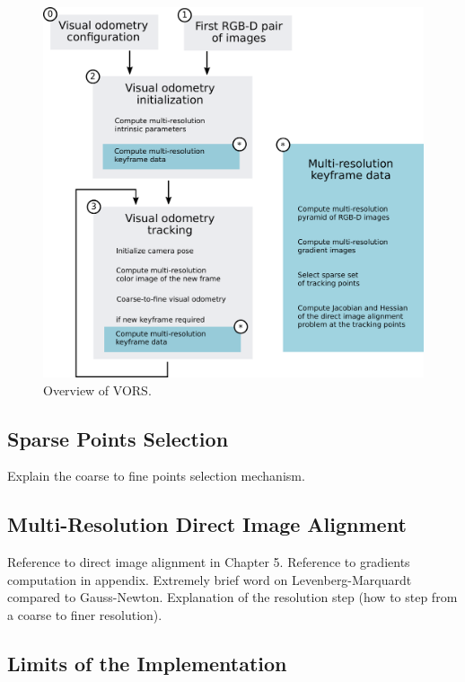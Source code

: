 \begin{figure}[ht]
	\centering
	\includegraphics[width=\linewidth]{assets/img/overview-vors.pdf}
	\caption{Overview of VORS.}%
	\label{fig:overview-vors}
\end{figure}

\subsection{Sparse Points Selection}%
\label{sub:sparse-points}

Explain the coarse to fine points selection mechanism.

\subsection{Multi-Resolution Direct Image Alignment}%
\label{sub:multi-res-direct-image-alignment}

Reference to direct image alignment in Chapter 5.
Reference to gradients computation in appendix.
Extremely brief word on Levenberg-Marquardt compared to Gauss-Newton.
Explanation of the resolution step (how to step from a coarse to finer resolution).

\subsection{Limits of the Implementation}%
\label{sub:limits-implementation}

